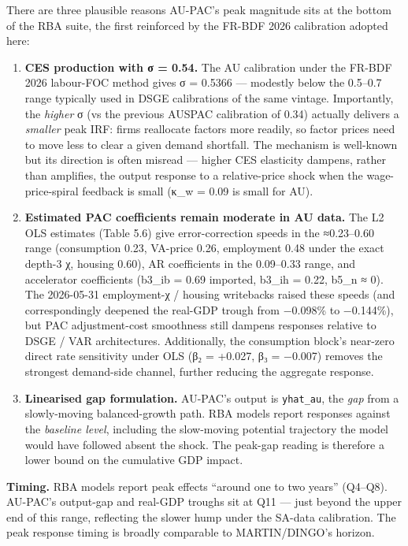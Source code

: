 \documentclass[
]{article}
\providecommand{\tightlist}{%
  \setlength{\itemsep}{0pt}\setlength{\parskip}{0pt}}
\begin{document}
There are three plausible reasons AU-PAC's peak magnitude sits at the
bottom of the RBA suite, the first reinforced by the FR-BDF 2026
calibration adopted here:

\begin{enumerate}
\def\labelenumi{\arabic{enumi}.}
\tightlist
\item
  \textbf{CES production with σ = 0.54.} The AU calibration under the
  FR-BDF 2026 labour-FOC method gives σ = 0.5366 --- modestly below the
  0.5--0.7 range typically used in DSGE calibrations of the same
  vintage. Importantly, the \emph{higher} σ (vs the previous AUSPAC
  calibration of 0.34) actually delivers a \emph{smaller} peak IRF:
  firms reallocate factors more readily, so factor prices need to move
  less to clear a given demand shortfall. The mechanism is well-known
  but its direction is often misread --- higher CES elasticity dampens,
  rather than amplifies, the output response to a relative-price shock
  when the wage-price-spiral feedback is small (κ\_w = 0.09 is small for
  AU).
\item
  \textbf{Estimated PAC coefficients remain moderate in AU data.} The L2
  OLS estimates (Table 5.6) give error-correction speeds in the
  ≈0.23--0.60 range (consumption 0.23, VA-price 0.26, employment 0.48
  under the exact depth-3 χ, housing 0.60), AR coefficients in the
  0.09--0.33 range, and accelerator coefficients (b3\_ib = 0.69
  imported, b3\_ih = 0.22, b5\_n ≈ 0). The 2026-05-31 employment-χ /
  housing writebacks raised these speeds (and correspondingly deepened
  the real-GDP trough from −0.098\% to −0.144\%), but PAC
  adjustment-cost smoothness still dampens responses relative to DSGE /
  VAR architectures. Additionally, the consumption block's near-zero
  direct rate sensitivity under OLS (β₂ = +0.027, β₃ = −0.007) removes
  the strongest demand-side channel, further reducing the aggregate
  response.
\item
  \textbf{Linearised gap formulation.} AU-PAC's output is
  \texttt{yhat\_au}, the \emph{gap} from a slowly-moving balanced-growth
  path. RBA models report responses against the \emph{baseline level},
  including the slow-moving potential trajectory the model would have
  followed absent the shock. The peak-gap reading is therefore a lower
  bound on the cumulative GDP impact.
\end{enumerate}

\textbf{Timing.} RBA models report peak effects ``around one to two
years'' (Q4--Q8). AU-PAC's output-gap and real-GDP troughs sit at Q11
--- just beyond the upper end of this range, reflecting the slower hump
under the SA-data calibration. The peak response timing is broadly
comparable to MARTIN/DINGO's horizon.
\end{document}
